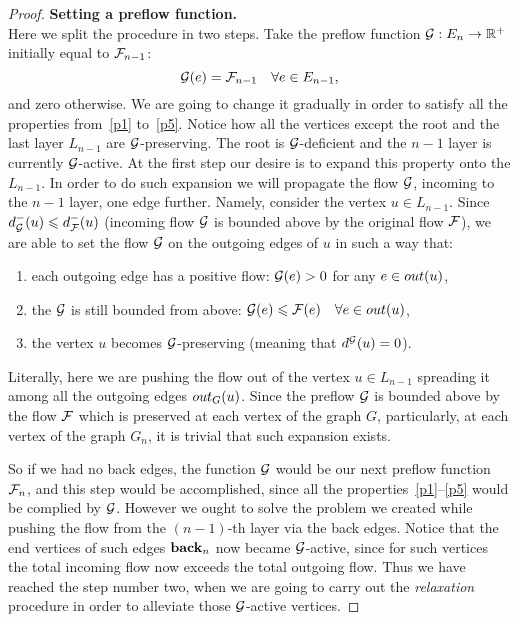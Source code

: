 \documentclass[12pt]{article}
\begin{document}
\begin{proof}
      \noindent\textbf{Setting a preflow function.}\\
      \noindent Here we split the procedure in two steps.
      Take the preflow function $\cal{G}: E_n \to \mathbb{R}^{+}$ initially equal to $\flowposn{n-1}$:
      \[
        \cal{G}(e) = \flowposn{n-1} \quad \forall e \in E_{n-1},
      \]
      and zero otherwise.
      We are going to change it gradually in order to satisfy all the properties from~\ref{p1} to~\ref{p5}.
      Notice how all the vertices except the root and the last layer $L_{n-1}$ are $\cal{G}$-preserving.
      The root is $\cal{G}$-deficient and the $n-1$ layer is currently $\cal{G}$-active.
      At the first step our desire is to expand this property onto the $L_{n-1}$.
      In order to do such expansion we will propagate the flow $\cal{G}$, incoming to the $n-1$ layer, one edge further.
      Namely, consider the vertex $u \in L_{n-1}$.
      Since $d_{\cal{G}}^{-}(u) \leq d_{\flowpos}^{-}(u)$ (incoming flow $\cal{G}$ is bounded above by the original flow $\flowpos$),
        we are able to set the flow $\cal{G}$ on the outgoing edges of $u$ in such a way that:
      \begin{enumerate}[label=\textbf{(\roman*)}]
        \item\label{posprop} each outgoing edge has a positive flow: $\cal{G}(e) > 0$ for any $e \in \eout(u)$,
        \item the $\cal{G}$ is still bounded from above: 
          $\cal{G}(e) \leq \flowpos(e) \quad \forall e \in \eout(u)$,
        \item the vertex $u$ becomes $\cal{G}$-preserving (meaning that $d^{\cal{G}}(u) = 0$).
      \end{enumerate}
      \begin{note}
        Literally, here we are pushing the flow out of the vertex $u \in L_{n-1}$ spreading it among all the outgoing edges
          $\eout_G(u)$.
        Since the preflow $\cal{G}$ is bounded above by the flow $\flowpos$ which is preserved at each vertex of the graph $G$,
          particularly, at each vertex of the graph $G_n$, it is trivial that such expansion exists.
      \end{note}
      So if we had no back edges, the function $\cal{G}$ would be our next preflow function $\flowposn{n}$, and this step would be accomplished,
        since all the properties~\ref{p1}--\ref{p5} would be complied by $\cal{G}$.
      However we ought to solve the problem we created while pushing the flow from the $(n-1)$-th layer via the back edges.
      Notice that the end vertices of such edges $\eback_{n}$ now became $\cal{G}$-active, since for such vertices
        the total incoming flow now exceeds the total outgoing flow.
      Thus we have reached the step number two, when we are going to carry out the \emph{relaxation} procedure in order to alleviate those $\cal{G}$-active
        vertices.


\end{proof}
\end{document}
